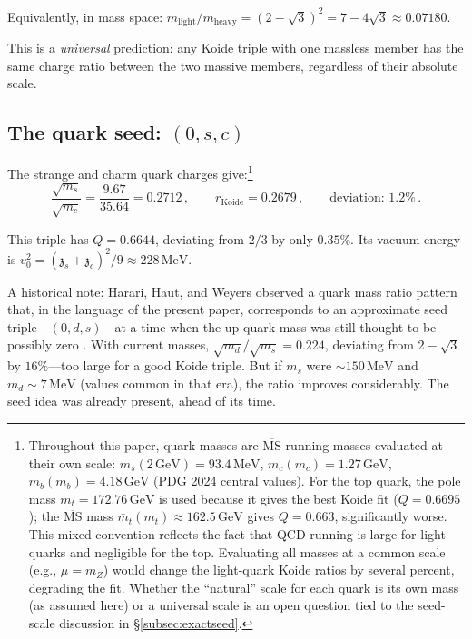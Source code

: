 \documentclass[12pt,a4paper]{article}
\newcommand{\MeV}{\,\text{MeV}}
\newcommand{\GeV}{\,\text{GeV}}
\newcommand{\zch}{\mathfrak{z}}
\begin{document}
Equivalently, in mass space: 
$m_{\text{light}}/m_{\text{heavy}} = (2 - \sqrt{3})^2 = 7 - 4\sqrt{3} 
\approx 0.07180$.

This is a \emph{universal} prediction: any Koide triple with one 
massless member has the same charge ratio between the two massive 
members, regardless of their absolute scale.

\subsection{The quark seed: $(0, s, c)$}

The strange and charm quark charges give:\footnote{Throughout 
this paper, quark masses are $\overline{\text{MS}}$ running masses 
evaluated at their own scale: $m_s(2\GeV) = 93.4\MeV$, 
$m_c(m_c) = 1.27\GeV$, $m_b(m_b) = 4.18\GeV$ (PDG 2024 central 
values). For the top quark, the pole mass $m_t = 172.76\GeV$ is 
used because it gives the best Koide fit ($Q = 0.6695$); the 
$\overline{\text{MS}}$ mass $\bar{m}_t(m_t) \approx 162.5\GeV$ 
gives $Q = 0.663$, significantly worse. This mixed convention 
reflects the fact that QCD running is large for light quarks and 
negligible for the top. Evaluating all masses at a common scale 
(e.g., $\mu = m_Z$) would change the light-quark Koide ratios 
by several percent, degrading the fit. Whether the ``natural'' 
scale for each quark is its own mass (as assumed here) or a 
universal scale is an open question tied to the seed-scale 
discussion in \S\ref{subsec:exactseed}.}
\begin{equation}
\frac{\sqrt{m_s}}{\sqrt{m_c}} = \frac{9.67}{35.64} = 0.2712\,, 
\qquad r_{\text{Koide}} = 0.2679\,, \qquad \text{deviation: } 1.2\%\,.
\end{equation}

This triple has $Q = 0.6644$, deviating from $2/3$ by only $0.35\%$. 
Its vacuum energy is $v_0^2 = (\zch_s + \zch_c)^2/9 \approx 228\MeV$.

A historical note: Harari, Haut, and Weyers \cite{Harari} observed 
a quark mass ratio pattern that, in the language of the present paper, 
corresponds to an approximate seed triple---$(0, d, s)$---at a time 
when the up quark mass was 
still thought to be possibly zero \cite{Harari}. With current masses, 
$\sqrt{m_d}/\sqrt{m_s} = 0.224$, deviating from $2 - \sqrt{3}$ by 
$16\%$---too large for a good Koide triple. But if $m_s$ were 
$\sim 150\MeV$ and $m_d \sim 7\MeV$ (values common in that era), the 
ratio improves considerably. The seed idea was already present, ahead 
of its time.
\end{document}
